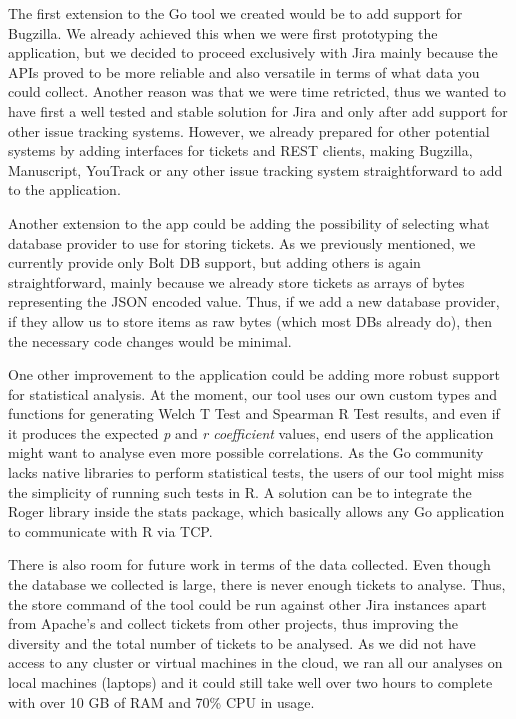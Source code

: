 \documentclass{mpaper}
\begin{document}
The first extension to the Go tool we created would be to add support for Bugzilla. We already achieved this 
when we were first prototyping the application, but we decided to proceed exclusively with Jira mainly because 
the APIs proved to be more reliable and also versatile in terms of what data you could collect. Another 
reason was that we were time retricted, thus we wanted to have first a well tested and stable solution for Jira and 
only after add support for other issue tracking systems. However, we already prepared for other potential systems by 
adding interfaces for tickets and REST clients, making Bugzilla, Manuscript, YouTrack or any 
other issue tracking system straightforward to add to the application.

Another extension to the app could be adding the possibility of selecting what database provider to use 
for storing tickets. As we previously mentioned, we currently provide only Bolt DB support, but adding others is 
again straightforward, mainly because we already store tickets as arrays of bytes representing the JSON encoded 
value. Thus, if we add a new database provider, if they allow us to store items as raw bytes (which most DBs already 
do), then the necessary code changes would be minimal.

One other improvement to the application could be adding more robust support for statistical analysis. At the moment, 
our tool uses our own custom types and functions for generating Welch T Test and Spearman R Test results, and even if 
it produces the expected \emph{p} and \emph{r coefficient} values, end users of the application might want to 
analyse even more possible correlations. As the Go community lacks native libraries to perform statistical tests, 
the users of our tool might miss the simplicity of running such tests in R. A solution can be to integrate the 
Roger library \cite{r_stats} inside the stats package, which basically allows any Go application to communicate with 
R via TCP. 

There is also room for future work in terms of the data collected. Even though the database we collected 
is large, there is never enough tickets to analyse. Thus, the store command of the tool could be run against 
other Jira instances apart from Apache's and collect tickets from other projects, thus improving the diversity 
and the total number of tickets to be analysed. As we did not have access to any cluster or virtual machines in 
the cloud, we ran all our analyses on local machines (laptops) and it could still take well over two hours to complete 
with over 10 GB of RAM and 70\% CPU in usage.
\end{document}
